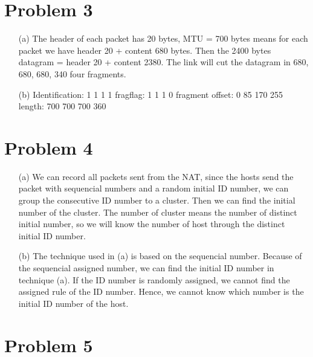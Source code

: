 \documentclass[12pt,a4paper]{article}
\begin{document}
\section*{Problem 3}    

\begin{enumerate}
    \item [(a)] 
        The header of each packet has 20 bytes, MTU = 700 bytes means for each packet we have header 20 + content 680 bytes.
        Then the 2400 bytes datagram = header 20 + content 2380.
        The link will cut the datagram in 680, 680, 680, 340 four fragments.

    \item[(b)]
        Identification: 1 1 1 1
        fragflag: 1 1 1 0
        fragment offset: 0 85 170 255
        length: 700 700 700 360

\end{enumerate}

\section*{Problem 4}

\begin{enumerate}
    \item [(a)] 
        We can record all packets sent from the NAT, since the hosts send the packet with sequencial numbers and a random initial ID number, we can group the consecutive ID number to a cluster.
        Then we can find the initial number of the cluster. The number of cluster means the number of distinct initial number, so we will know the number of host through the distinct initial ID number. 
    \item[(b)]
        The technique used in (a) is based on the sequencial number. Because of the sequencial assigned number, we can find the initial ID number in technique (a).
        If the ID number is randomly assigned, we cannot find the assigned rule of the ID number. Hence, we cannot know which number is the initial ID number of the host.
    
\end{enumerate}

\section*{Problem 5}
\end{document}
